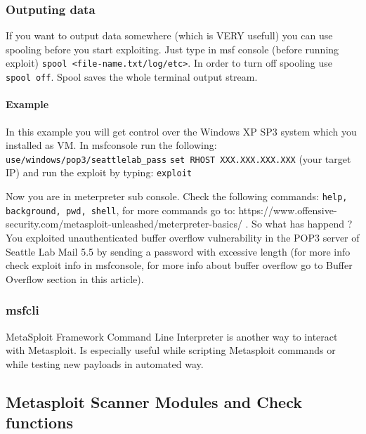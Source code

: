 \documentclass{article}[12pt]
\begin{document}
\subsubsection{Outputing data}
If you want to output data somewhere (which is VERY usefull) you can use spooling before you start exploiting.
Just type in msf console (before running exploit) \texttt{spool <file-name.txt/log/etc>}.
In order to turn off spooling use \texttt{spool off}.
Spool saves the whole terminal output stream.
\paragraph{Example}
In this example you will get control over the Windows XP SP3 system which you installed as VM. In msfconsole run the following: \newline\newline
\texttt{use/windows/pop3/seattlelab\_pass} \newline
\texttt{set RHOST XXX.XXX.XXX.XXX} (your target IP) \newline and run the exploit by typing: \newline \texttt{exploit} \newline \newline

Now you are in meterpreter sub console.
Check the following commands: \texttt{help, background, pwd, shell}, for more commands go to: https://www.offensive-security.com/metasploit-unleashed/meterpreter-basics/ .
So what has happend ?
You exploited unauthenticated buffer overflow vulnerability in the POP3 server of Seattle Lab Mail 5.5 by sending a password with excessive length (for more info check exploit info in msfconsole, for more info about buffer overflow go to Buffer Overflow section in this article).

\subsubsection{msfcli}
MetaSploit Framework Command Line Interpreter is another way to interact with Metasploit.
Is especially useful while scripting Metasploit commands or while testing new payloads in automated way.


\subsection{Metasploit Scanner Modules and Check functions}
\end{document}
